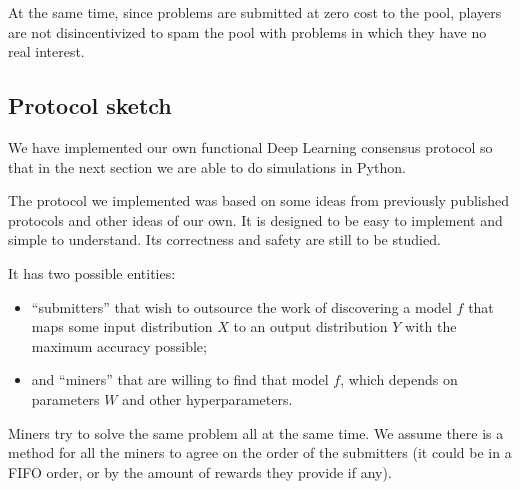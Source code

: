\documentclass[conference]{IEEEtran}
\begin{document}
At the same time, since problems are submitted at zero cost to the pool, players are not disincentivized to spam the pool with problems in which they have no real interest.

\subsection{Protocol sketch}

We have implemented our own functional Deep Learning consensus protocol so that in the next section we are able to do simulations in Python.

The protocol we implemented was based on some ideas from previously published protocols and other ideas of our own. It is designed to be easy to implement and simple to understand. Its correctness and safety are still to be studied.

It has two possible entities:

\begin{itemize}
\item ``submitters'' that wish to outsource the work of discovering a model $f$ that maps some input distribution $X$ to an output distribution $Y$ with the maximum accuracy possible;
\item and ``miners'' that are willing to find that model $f$, which depends on parameters $W$ and other hyperparameters.
\end{itemize} 
Miners try to solve the same problem all at the same time. We assume there is a method for all the miners to agree on the order of the submitters (it could be in a FIFO order, or by the amount of rewards they provide if any).
\end{document}

